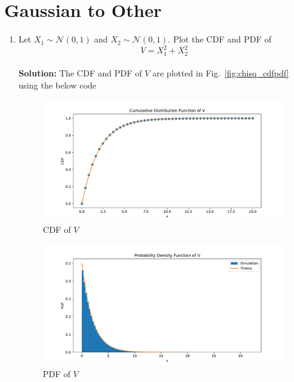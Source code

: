 \documentclass[12pt]{book}
\newcommand\figref{Fig.~\ref}
\newcommand{\solution}{\noindent \textbf{Solution: }}
\providecommand{\gauss}[2]{\mathcal{N}\ensuremath{\left(#1,#2\right)}}
\begin{document}
\section{Gaussian to Other}
\begin{enumerate}
\item
Let $X_1 \sim  \gauss{0}{1}$ and $X_2 \sim  \gauss{0}{1}$. Plot the CDF and PDF of
%
\begin{equation}
V = X_1^2 + X_2^2
\end{equation}\\
\solution The CDF and PDF of $V$ are plotted in \figref{fig:chisq_cdfpdf}  using the below code
\begin{center}
\end{center}
\begin{figure}[H]
\centering
\includegraphics[width=\columnwidth]{./figs/4/4.1.1c.pdf}
\caption{CDF of $V$}
\label{fig:chisq_cdf}
\end{figure}
\begin{figure}[H]
\centering
\includegraphics[width=\columnwidth]{./figs/4/4.1.1p.pdf}
\caption{PDF of $V$}
\label{fig:chisq_pdf}
\end{figure}


\end{enumerate}
\end{document}
